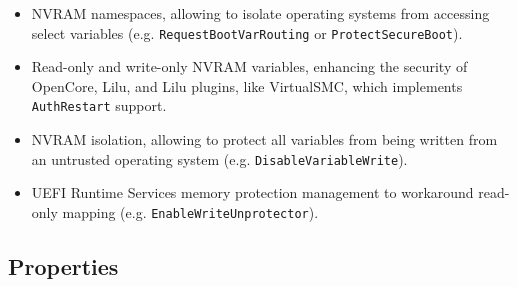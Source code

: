 \documentclass[]{article}
\makeatletter
\renewcommand{\label}[1]{%
\zref@wrapper@immediate{\oldlabel{#1}}}  %
\makeatother
\begin{document}
\begin{itemize}
  \item NVRAM namespaces, allowing to isolate operating systems from accessing select
  variables (e.g. \texttt{RequestBootVarRouting} or \texttt{ProtectSecureBoot}).
  \item Read-only and write-only NVRAM variables, enhancing the security of OpenCore,
  Lilu, and Lilu plugins, like VirtualSMC, which implements \texttt{AuthRestart} support.
  \item NVRAM isolation, allowing to protect all variables from being written from
  an untrusted operating system (e.g. \texttt{DisableVariableWrite}).
  \item UEFI Runtime Services memory protection management to workaround read-only
  mapping (e.g. \texttt{EnableWriteUnprotector}).
\end{itemize}

\subsection{Properties}\label{uefiprops}
\end{document}
